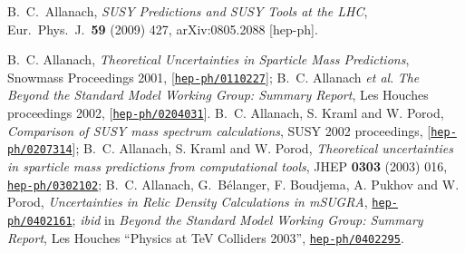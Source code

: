 \documentclass{article}
\begin{document}
\begin{thebibliography}{10}




  B.~C.~Allanach,
  {\em SUSY Predictions and SUSY Tools at the LHC}, Eur.\ Phys.\ J.\ {\bf 59}
  (2009) 427,
  arXiv:0805.2088 [hep-ph].

B.~C. Allanach, {\it Theoretical Uncertainties in Sparticle Mass Predictions},
Snowmass Proceedings 2001, 
  [\href{http://xxx.lanl.gov/abs/hep-ph/0110227}{{\tt hep-ph/0110227}}];
B.~C. Allanach {\em et al}. {\it The Beyond the Standard Model Working Group:
  Summary Report}, Les Houches proceedings 2002,
  [\href{http://xxx.lanl.gov/abs/hep-ph/0204031}{{\tt hep-ph/0204031}}].
B.~C. Allanach, S. Kraml and W. Porod, {\it Comparison of SUSY mass spectrum
  calculations}, SUSY 2002 proceedings,
[\href{http://xxx.lanl.gov/abs/hep-ph/0207314}{{\tt hep-ph/0207314}}];
B.~C. Allanach, S. Kraml and W. Porod, {\it Theoretical uncertainties in
  sparticle mass predictions from computational tools}, 
JHEP {\bf 0303} (2003) 016, 
\href{http://xxx.lanl.gov/abs/hep-ph/0302102}{{\tt hep-ph/0302102}};
B.~C. Allanach, G.~B\'{e}langer, F. Boudjema, A. Pukhov and W. Porod, 
{\it Uncertainties in Relic Density Calculations in mSUGRA},
\href{http://xxx.lanl.gov/abs/hep-ph/0402161}{{\tt hep-ph/0402161}};
{\em ibid}\/ in {\it Beyond the Standard Model Working Group: Summary Report},
Les Houches ``Physics at TeV Colliders 2003'', 
\href{http://xxx.lanl.gov/abs/hep-ph/0402161}{{\tt hep-ph/0402295}}.


\end{thebibliography}
\end{document}
